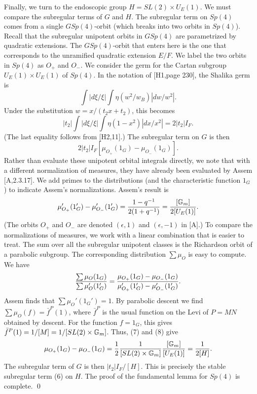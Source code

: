 \documentclass{amsart}
\newcommand\G{{\Bbb G}}
\begin{document}
Finally, we turn to the endoscopic group $H = SL(2) \times U_E(1)$.
We must compare the subregular terms of $G$ and $H$.
The subregular term on $Sp(4)$ comes from
a single $GSp(4)$-orbit (which breaks into two orbits in $Sp(4)$).
Recall that the subregular 
unipotent orbits in $GSp(4)$ are parametrized
by quadratic extensions.
The $GSp(4)$-orbit that enters here is 
the one that corresponds to the unramified quadratic
extension $E/F$.  We label the two orbits in $Sp(4)$ as
$O_+$ and $O_-$.  We consider the germ for the Cartan subgroup
$U_E(1)\times U_E(1)$ of $Sp(4)$.  In the notation of [H1,page
 230],
the Shalika germ
is
$$\int|d\xi/\xi| \int \eta(w^2/w_B)|dw/w^2|.$$
Under the substitution $w = x/(t_2 x+t_2)$, this becomes
$$|t_2| \int |d\xi/\xi| 
\int \eta(1-x^2) |dx/x^2| = 2 |t_2| I_F.$$
(The last equality follows from [H2,11].)
The subregular term on $G$ is then 
$$ 2 |t_2| I_F [\mu_{O_+}(1_G) - \mu_{O_-} (1_G)].$$
Rather than evaluate these unipotent orbital integrals directly,
we note that with a different normalization of measures, they
have already been evaluated by Assem [A,2.3.17].  We add primes to
the distributions (and the characteristic function $1_G$) to
indicate Assem's normalizations.  Assem's result is
\begin{equation}
\mu'_{O_+}(1_G') - \mu'_{O_-}(1_G') = {1-q^{-1}\over 2(1+q^{-1})} =
{[\G_m]\over 2[U_E(1)]}.
\end{equation}
(The orbits $O_+$ and $O_-$ are denoted $(\epsilon,1)$
and $(\epsilon,-1)$ in [A].)
To compare the normalizations of measures, we work with a linear
combination that is easier to treat.  The sum over all the subregular
unipotent classes is the Richardson orbit of a parabolic subgroup.
The corresponding distribution $\sum \mu_O$ is easy to compute.
We have
\begin{equation}
{\sum \mu_O (1_G)\over \sum \mu'_O(1'_G)} =
  {\mu_{O_+}(1_G) - \mu_{O_-}(1_G) \over 
   \mu'_{O_+} (1'_G) - \mu'_{O_-} (1'_G)}.
\end{equation}
Assem finds that $\sum\mu_O'(1_G') = 1$.
By parabolic descent we find $\sum\mu_O(f) = \bar f^P(1)$, where
$\bar f^P$ is the usual function on the Levi of $P=MN$ obtained by
descent.  For the function $f = 1_G$, this gives
$\bar f^P(1) = 1/[M] = 1/[SL(2)\times \G_m]$.
Thus, (7) and (8) give
$$\mu_{O_+}(1_G) - \mu_{O_-}(1_G) = 
  {1\over 2} {1 \over [SL(2)\times \G_m]} {[\G_m]\over [U_E(1)]} =
{1\over 2[H]}.$$
The subregular term of $G$ is then
$|t_2|I_F/[H]$.  This is precisely the stable subregular 
term (6)
on $H$.  The proof of the fundamental lemma 
for $Sp(4)$ is complete. \qed
\end{document}
